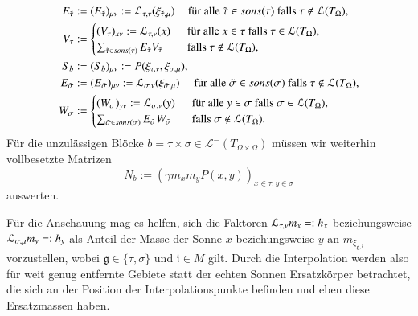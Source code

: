     \begin{align}
      E_{\tilde \tau} &:=
	(E_{\tilde \tau})_{\mu \nu} := \mathcal{L}_{\tau, \nu}(\xi_{\tilde \tau, \mu}) \ \ \ \, \text{ für alle } \tilde \tau \in sons(\tau) \text{ falls } \tau \notin \mathcal{L}(T_\Omega), \nonumber\\
      V_\tau &:=
      \begin{cases}
	(V_\tau)_{x \nu}   := \mathcal{L}_{\tau, \nu}(x) & \ \text{ für alle } x \in \tau \text{ falls } \tau \in \mathcal{L}(T_\Omega),\\
	\sum_{\tilde \tau \in sons(\tau)} E_{\tilde \tau} V_{\tilde \tau}  & \ \text{ falls } \tau \notin \mathcal{L}(T_\Omega),\\
      \end{cases}\label{eq:vtau}\\
      S_b &:= (S_b)_{\mu \nu} := P( \xi_{\tau, \nu} , \xi_{\sigma, \mu} ), \nonumber\\
      E_{\tilde \sigma} &:=
	(E_{\tilde \sigma})_{\mu \nu} := \mathcal{L}_{\sigma, \nu}(\xi_{\tilde \sigma, \mu}) \ \ \ \; \text{ für alle } \tilde \sigma \in sons(\sigma) \text{ falls } \tau \notin \mathcal{L}(T_\Omega), \nonumber\\
      W_\sigma &:=
      \begin{cases}
	(W_\sigma)_{y \nu}   := \mathcal{L}_{\sigma, \nu}(y) & \ \text{ für alle } y \in \sigma \text{ falls } \sigma \in \mathcal{L}(T_\Omega),\\
	\sum_{\tilde \sigma \in sons(\sigma)} E_{\tilde \sigma} W_{\tilde \sigma}  & \ \text{ falls } \sigma \notin \mathcal{L}(T_\Omega).\\
      \end{cases}\label{eq:wsigma}      
    \end{align}
    Für die unzulässigen Blöcke $b = \tau \times \sigma \in \mathcal{L}^-(T_{\Omega \times \Omega})$ müssen wir weiterhin vollbesetzte Matrizen
    \[
      N_b := \left( \gamma m_x  m_y P(x, y) \right)_{x \in \tau, y \in \sigma}
    \]
    auswerten.

    Für die Anschauung mag es helfen, sich die Faktoren $\mathcal{L}_{\tau, \nu} m_x =: h_x$ beziehungsweise $\mathcal{L}_{\sigma, \mu} m_y =: h_y$ als Anteil der Masse der Sonne $x$ beziehungsweise $y$ an 
     $m_{\xi_{\mathfrak{g}, \mathfrak{i}}}$ vorzustellen, wobei $\mathfrak{g} \in \{\tau, \sigma\}$ und $\mathfrak{i} \in M$ gilt.
    Durch die Interpolation werden also für weit genug entfernte Gebiete statt der echten Sonnen Ersatzkörper betrachtet, die sich an der Position der Interpolationspunkte befinden 
    und eben diese Ersatzmassen haben. 
    
